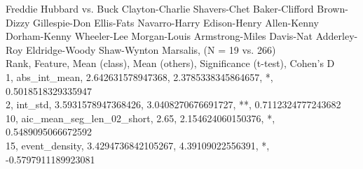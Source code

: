 Freddie Hubbard vs. Buck Clayton-Charlie Shavers-Chet Baker-Clifford Brown-Dizzy Gillespie-Don Ellis-Fats Navarro-Harry Edison-Henry Allen-Kenny Dorham-Kenny Wheeler-Lee Morgan-Louis Armstrong-Miles Davis-Nat Adderley-Roy Eldridge-Woody Shaw-Wynton Marsalis, (N = 19 vs. 266)\\
Rank, Feature, Mean (class), Mean (others), Significance (t-test), Cohen's D\\
1, abs_int_mean, 2.642631578947368, 2.3785338345864657, *, 0.5018518329335947\\
2, int_std, 3.5931578947368426, 3.0408270676691727, **, 0.7112324777243682\\
10, aic_mean_seg_len_02_short, 2.65, 2.154624060150376, *, 0.5489095066672592\\
15, event_density, 3.4294736842105267, 4.39109022556391, *, -0.5797911189923081\\
